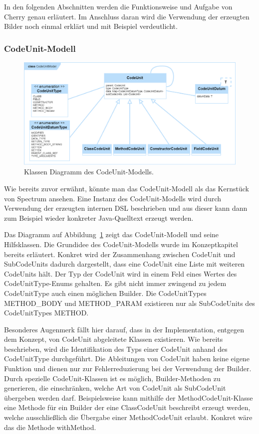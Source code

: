 \documentclass[12pt,oneside,a4paper,parskip]{scrbook}
\begin{document}
In den folgenden Abschnitten werden die Funktionsweise und Aufgabe von Cherry genau erläutert. Im Anschluss daran wird die Verwendung der erzeugten Bilder noch einmal erklärt und mit Beispiel verdeutlicht.

\subsubsection{CodeUnit-Modell}

\begin{figure}[htbp]
\centering
\includegraphics[width=1.0\textwidth]{bilder/classCu}
\caption{Klassen Diagramm des CodeUnit-Modells.}
\label{fig:classcu}
\end{figure}

Wie bereits zuvor erwähnt, könnte man das CodeUnit-Modell als das Kernstück von Spectrum ansehen. Eine Instanz des CodeUnit-Modells wird durch Verwendung der erzeugten internen DSL beschrieben und aus dieser kann dann zum Beispiel wieder konkreter Java-Quelltext erzeugt werden.

Das Diagramm auf Abbildung~\ref{fig:classcu} zeigt das CodeUnit-Modell und seine Hilfsklassen.
Die Grundidee des CodeUnit-Modells wurde im Konzeptkapitel bereits erläutert. Konkret wird der Zusammenhang zwischen CodeUnit und SubCodeUnits dadurch dargestellt, dass eine CodeUnit eine Liste mit weiteren CodeUnits hält. Der Typ der CodeUnit wird in einem Feld eines Wertes des CodeUnitType-Enums gehalten. Es gibt nicht immer zwingend zu jedem CodeUnitType auch einen möglichen Builder. Die CodeUnitTypes METHOD\_BODY und METHOD\_PARAM existieren nur als SubCodeUnits des CodeUnitTypes METHOD.

Besonderes Augenmerk fällt hier darauf, dass in der Implementation, entgegen dem Konzept, von CodeUnit abgeleitete Klassen existieren. Wie bereits beschrieben, wird die Identifikation des Typs einer CodeUnit anhand des CodeUnitType durchgeführt. Die Ableitungen von CodeUnit haben keine eigene Funktion und dienen nur zur Fehlerreduzierung bei der Verwendung der Builder. Durch spezielle CodeUnit-Klassen ist es möglich, Builder-Methoden zu generieren, die einschränken, welche Art von CodeUnit als SubCodeUnit übergeben werden darf. Beispielsweise kann mithilfe der MethodCodeUnit-Klasse eine Methode für ein Builder der eine ClassCodeUnit beschreibt erzeugt werden, welche ausschließlich die Übergabe einer MethodCodeUnit erlaubt. Konkret wäre das die Methode withMethod.
\end{document}
